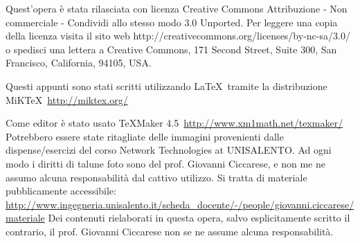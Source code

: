 \documentclass[11 pt,a4paper,twoside,openany]{book}
\begin{document}

\newpage
\null{}\null

\newpage
Quest'opera è stata rilasciata con licenza Creative Commons Attribuzione - Non commerciale - Condividi allo stesso modo 3.0 Unported. Per leggere una copia della licenza visita il sito web http://creativecommons.org/licenses/by-nc-sa/3.0/ o spedisci una lettera a Creative Commons, 171 Second Street, Suite 300, San Francisco, California, 94105, USA.\par \ccbyncsaeu
	\vfill
	Questi appunti sono stati scritti utilizzando \LaTeX\ tramite la distribuzione MiKTeX\ \url{http://miktex.org/}  
	
	Come editor è stato usato TeXMaker 4.5\ \url{http://www.xm1math.net/texmaker/}
	\vfill
Potrebbero essere state ritagliate delle immagini provenienti dalle dispense/esercizi del corso Network Technologies at UNISALENTO. Ad ogni modo i diritti di talune foto sono del prof. Giovanni Ciccarese, e non me ne assumo alcuna responsabilità dal cattivo utilizzo. Si tratta di materiale pubblicamente accessibile: \url{http://www.ingegneria.unisalento.it/scheda_docente/-/people/giovanni.ciccarese/materiale}
	\vfill
Dei contenuti rielaborati in questa opera, salvo esplicitamente scritto il contrario, il prof. Giovanni Ciccarese non se ne assume alcuna responsabilità. 

\null{}\null

\thispagestyle{fancy}
\fancyhead{}
\fancyfoot{}
\fancyfoot[C]{\thepage}
\vspace{2cm}


\noindent
\end{document}
